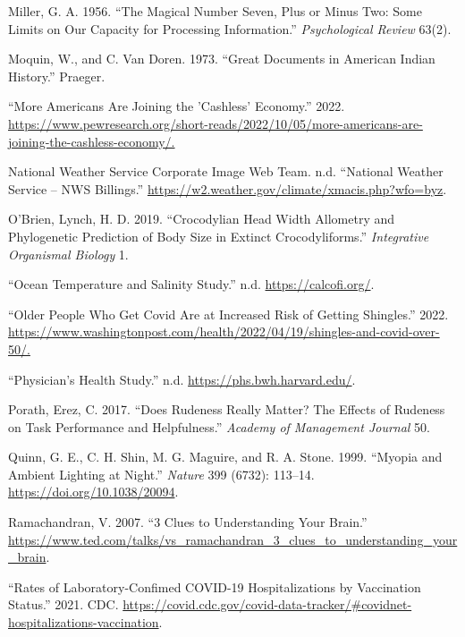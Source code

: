 \documentclass[
]{report}
\newlength{\cslhangindent}
\newenvironment{CSLReferences}[2] %
 {\begin{list}{}{%
  \setlength{\itemindent}{0pt}
  \setlength{\leftmargin}{0pt}
  \setlength{\parsep}{0pt}
  \ifodd #1
   \setlength{\leftmargin}{\cslhangindent}
   \setlength{\itemindent}{-1\cslhangindent}
  \fi
  \setlength{\itemsep}{#2\baselineskip}}}
 {\end{list}}
\begin{document}
\begin{CSLReferences}{1}{0}
Miller, G. A. 1956. {``The Magical Number Seven, Plus or Minus Two: Some Limits on Our Capacity for Processing Information.''} \emph{Psychological Review} 63(2).

Moquin, W., and C. Van Doren. 1973. {``Great Documents in American Indian History.''} Praeger.

{``More Americans Are Joining the 'Cashless' Economy.''} 2022. \url{https://www.pewresearch.org/short-reads/2022/10/05/more-americans-are-joining-the-cashless-economy/.}

National Weather Service Corporate Image Web Team. n.d. {``National Weather Service -- {NWS} Billings.''} \url{https://w2.weather.gov/climate/xmacis.php?wfo=byz}.

O'Brien, Lynch, H. D. 2019. {``Crocodylian Head Width Allometry and Phylogenetic Prediction of Body Size in Extinct Crocodyliforms.''} \emph{Integrative Organismal Biology} 1.

{``Ocean Temperature and Salinity Study.''} n.d. \url{https://calcofi.org/}.

{``Older People Who Get Covid Are at Increased Risk of Getting Shingles.''} 2022. \url{https://www.washingtonpost.com/health/2022/04/19/shingles-and-covid-over-50/.}

{``Physician's Health Study.''} n.d. \url{https://phs.bwh.harvard.edu/}.

Porath, Erez, C. 2017. {``Does Rudeness Really Matter? The Effects of Rudeness on Task Performance and Helpfulness.''} \emph{Academy of Management Journal} 50.

Quinn, G. E., C. H. Shin, M. G. Maguire, and R. A. Stone. 1999. {``Myopia and Ambient Lighting at Night.''} \emph{Nature} 399 (6732): 113--14. \url{https://doi.org/10.1038/20094}.

Ramachandran, V. 2007. {``3 Clues to Understanding Your Brain.''} \url{https://www.ted.com/talks/vs_ramachandran_3_clues_to_understanding_your_brain}.

{``Rates of Laboratory-Confimed COVID-19 Hospitalizations by Vaccination Status.''} 2021. CDC. \url{https://covid.cdc.gov/covid-data-tracker/\#covidnet-hospitalizations-vaccination}.


\end{CSLReferences}
\end{document}
